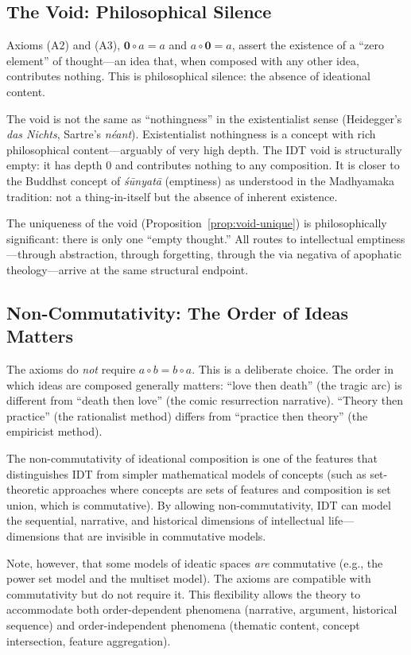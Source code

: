 \documentclass[11pt,openany]{book}
\theoremstyle{definition}
\theoremstyle{plain}
\theoremstyle{remark}
\newcommand{\compose}{\circ}                 %
\newcommand{\void}{\mathbf{0}}              %
\begin{document}
\subsection{The Void: Philosophical Silence}

Axioms (A2) and (A3), $\void \compose a = a$ and $a \compose \void = a$, assert the existence of a ``zero element'' of thought---an idea that, when composed with any other idea, contributes nothing. This is philosophical silence: the absence of ideational content.

The void is not the same as ``nothingness'' in the existentialist sense (Heidegger's \textit{das Nichts}, Sartre's \textit{néant}). Existentialist nothingness is a concept with rich philosophical content---arguably of very high depth. The IDT void is structurally empty: it has depth 0 and contributes nothing to any composition. It is closer to the Buddhst concept of \textit{śūnyatā} (emptiness) as understood in the Madhyamaka tradition: not a thing-in-itself but the absence of inherent existence.

The uniqueness of the void (Proposition~\ref{prop:void-unique}) is philosophically significant: there is only one ``empty thought.'' All routes to intellectual emptiness---through abstraction, through forgetting, through the via negativa of apophatic theology---arrive at the same structural endpoint.

\subsection{Non-Commutativity: The Order of Ideas Matters}

The axioms do \emph{not} require $a \compose b = b \compose a$. This is a deliberate choice. The order in which ideas are composed generally matters: ``love then death'' (the tragic arc) is different from ``death then love'' (the comic resurrection narrative). ``Theory then practice'' (the rationalist method) differs from ``practice then theory'' (the empiricist method).

The non-commutativity of ideational composition is one of the features that distinguishes IDT from simpler mathematical models of concepts (such as set-theoretic approaches where concepts are sets of features and composition is set union, which is commutative). By allowing non-commutativity, IDT can model the sequential, narrative, and historical dimensions of intellectual life---dimensions that are invisible in commutative models.

Note, however, that some models of ideatic spaces \emph{are} commutative (e.g., the power set model and the multiset model). The axioms are compatible with commutativity but do not require it. This flexibility allows the theory to accommodate both order-dependent phenomena (narrative, argument, historical sequence) and order-independent phenomena (thematic content, concept intersection, feature aggregation).
\end{document}
